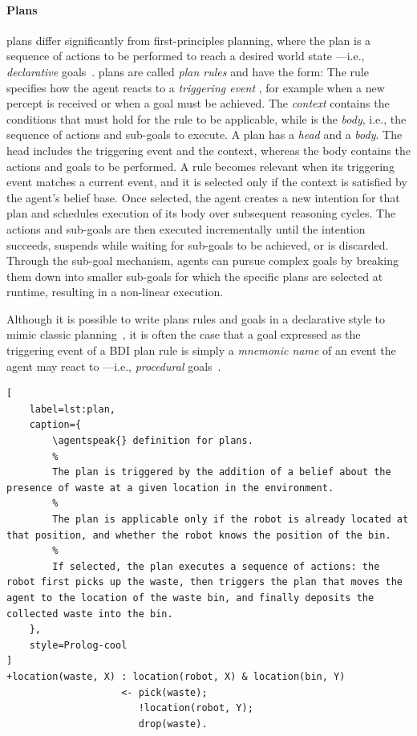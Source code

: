 \paragraph{Plans}
\agentspeak{} plans differ significantly from first-principles planning,
where the plan is a sequence of actions to be performed to reach a desired world state%
---i.e., \emph{declarative} goals~\cite{winikoff2002kr}.
%
\agentspeak{} plans are called \emph{plan rules} and have the form:
%
%
The rule specifies how the agent reacts to a \emph{triggering event} ,
for example when a new percept is received or when a goal must be achieved.
%
The \emph{context}  contains the conditions that must hold for the rule to be applicable,
while  is the \emph{body}, i.e., the sequence of actions and sub-goals to execute.
%
A plan has a \emph{head} and a \emph{body}. The head includes the triggering event and the context, whereas the body contains the actions and goals to be performed.
%
A rule becomes relevant when its triggering event matches a current event, and it is selected only if the context is satisfied by the agent's belief base.
%
Once selected, the agent creates a new intention for that plan and schedules execution of its body over subsequent reasoning cycles.
%
The actions and sub-goals are then executed incrementally until the intention succeeds, suspends while waiting for sub-goals to be achieved, or is discarded.
%
Through the sub-goal mechanism,
\agentspeak{} agents can pursue complex goals by breaking them down into smaller sub-goals
for which the specific plans are selected at runtime,
resulting in a non-linear execution.

Although it is possible to write plans rules and goals in a declarative style to mimic classic planning~\cite{hubner2006dalt, HindriksBHM00},
it is often the case that a goal expressed as the triggering event
of a \ac{BDI} plan rule
is simply a \emph{mnemonic name} of an event the agent may react to%
---i.e., \emph{procedural} goals~\cite{winikoff2002kr}.

\begin{lstlisting}[
    label=lst:plan,
    caption={
        \agentspeak{} definition for plans.
        %
        The plan is triggered by the addition of a belief about the presence of waste at a given location in the environment.
        %
        The plan is applicable only if the robot is already located at that position, and whether the robot knows the position of the bin.
        %
        If selected, the plan executes a sequence of actions: the robot first picks up the waste, then triggers the plan that moves the agent to the location of the waste bin, and finally deposits the collected waste into the bin.
    },
    style=Prolog-cool
]
+location(waste, X) : location(robot, X) & location(bin, Y)
                    <- pick(waste);
                       !location(robot, Y);
                       drop(waste).
\end{lstlisting}

